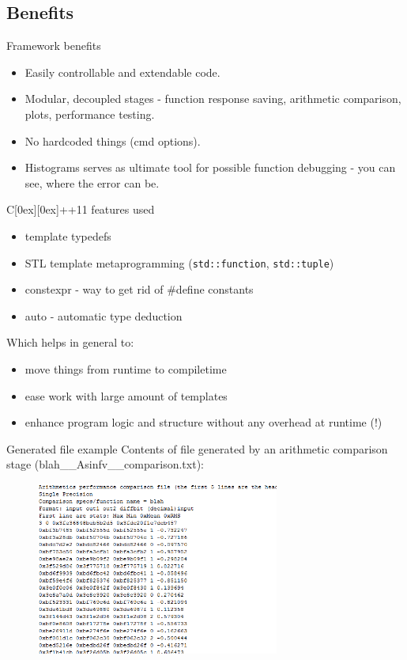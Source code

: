 \documentclass[compress,mathserif]{beamer}
\theoremstyle{definition}
\theoremstyle{plain}
\newcommand{\beI}{\begin{itemize}}
\newcommand{\enI}{\end{itemize}}
\newcommand{\Cpp}{C\raisebox{0.15ex}[0ex][0ex]{++}}
\begin{document}
\subsection{Benefits}
    \begin{frame}{Framework benefits}
        \beI
            \item Easily controllable and extendable code.
            \item Modular, decoupled stages - function response saving, arithmetic comparison, plots, performance testing.
            \item No hardcoded things (cmd options).
            \item Histograms serves as ultimate tool for possible function debugging - you can see, where the error can be.
        \enI
    \end{frame}
    
    \begin{frame}{\Cpp 11 features used}
        \beI
            \item template typedefs
            \item STL template metaprogramming ({\tt std::function}, {\tt std::tuple})
            \item constexpr - way to get rid of \#define constants
            \item auto - automatic type deduction
        \enI
        Which helps in general to:
        \beI
            \item move things from runtime to compiletime
            \item ease work with large amount of templates
            \item enhance program logic and structure without any overhead at runtime (!)
        \enI
    \end{frame}
    
     \begin{frame}{Generated file example}
        Contents of file generated by an arithmetic comparison stage (blah\_\_Asinfv\_\_comparison.txt):
         \begin{figure}
          \includegraphics[width = 80mm]{img/example.png}
        \end{figure}
    \end{frame}
\end{document}
